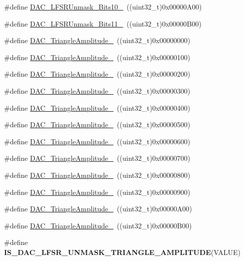 \begin{DoxyCompactItemize}
\item 
\#define \hyperlink{group__DAC__lfsrunmask__triangleamplitude_ga7670f0e10f062571d0e56027ef653228}{DAC\_\-LFSRUnmask\_\-Bits10\_}~((uint32\_\-t)0x00000A00)
\item 
\#define \hyperlink{group__DAC__lfsrunmask__triangleamplitude_gaeb9b5992b771f9a14587eeda58227831}{DAC\_\-LFSRUnmask\_\-Bits11\_}~((uint32\_\-t)0x00000B00)
\item 
\#define \hyperlink{group__DAC__lfsrunmask__triangleamplitude_ga49b1eddf4e6371b4be8751162dc94ac4}{DAC\_\-TriangleAmplitude\_}~((uint32\_\-t)0x00000000)
\item 
\#define \hyperlink{group__DAC__lfsrunmask__triangleamplitude_ga9798d68c3bbf0a57306bf2f962697377}{DAC\_\-TriangleAmplitude\_}~((uint32\_\-t)0x00000100)
\item 
\#define \hyperlink{group__DAC__lfsrunmask__triangleamplitude_gad3f31de1277836df1109576a53c47e87}{DAC\_\-TriangleAmplitude\_}~((uint32\_\-t)0x00000200)
\item 
\#define \hyperlink{group__DAC__lfsrunmask__triangleamplitude_ga42653712ce783d33ecb2f3e97e9c2ece}{DAC\_\-TriangleAmplitude\_}~((uint32\_\-t)0x00000300)
\item 
\#define \hyperlink{group__DAC__lfsrunmask__triangleamplitude_ga10b15745b749c62a56bd3d7bd5a27e1b}{DAC\_\-TriangleAmplitude\_}~((uint32\_\-t)0x00000400)
\item 
\#define \hyperlink{group__DAC__lfsrunmask__triangleamplitude_gaaae92dae9c4da55e29c645396825e36b}{DAC\_\-TriangleAmplitude\_}~((uint32\_\-t)0x00000500)
\item 
\#define \hyperlink{group__DAC__lfsrunmask__triangleamplitude_gaacec0af3f69db46f8984be3af9ecadfb}{DAC\_\-TriangleAmplitude\_}~((uint32\_\-t)0x00000600)
\item 
\#define \hyperlink{group__DAC__lfsrunmask__triangleamplitude_gadb404422c86a7b92d78e6d9617e8ce4d}{DAC\_\-TriangleAmplitude\_}~((uint32\_\-t)0x00000700)
\item 
\#define \hyperlink{group__DAC__lfsrunmask__triangleamplitude_ga565b0c97bbdf152756617d491bf8ef85}{DAC\_\-TriangleAmplitude\_}~((uint32\_\-t)0x00000800)
\item 
\#define \hyperlink{group__DAC__lfsrunmask__triangleamplitude_ga7d573b0cebb1b939bd83367effb93d89}{DAC\_\-TriangleAmplitude\_}~((uint32\_\-t)0x00000900)
\item 
\#define \hyperlink{group__DAC__lfsrunmask__triangleamplitude_gad33d28d7fcc09d84500ea9b6e6c5feed}{DAC\_\-TriangleAmplitude\_}~((uint32\_\-t)0x00000A00)
\item 
\#define \hyperlink{group__DAC__lfsrunmask__triangleamplitude_ga3ce69f5a63a2464dc4b5f73cb6fe72f5}{DAC\_\-TriangleAmplitude\_}~((uint32\_\-t)0x00000B00)
\item 
\#define {\bfseries IS\_\-DAC\_\-LFSR\_\-UNMASK\_\-TRIANGLE\_\-AMPLITUDE}(VALUE)
\end{DoxyCompactItemize}


